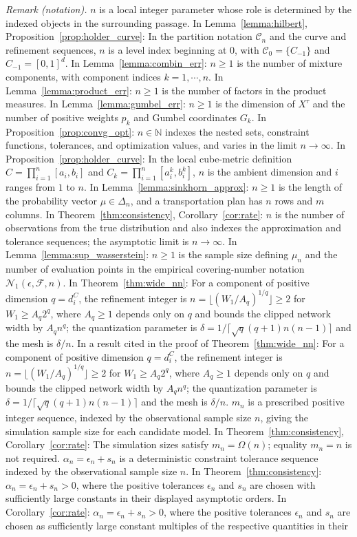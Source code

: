 \documentclass[12pt]{article}
\theoremstyle{plain}
\theoremstyle{definition}
\theoremstyle{remark}
\begin{document}
\noindent\textit{Remark (notation).} $n$ is a local integer parameter whose role is determined by the indexed objects in the surrounding passage. In Lemma~\ref{lemma:hilbert}, Proposition~\ref{prop:holder_curve}: In the partition notation $\mathcal{C}_n$ and the curve and refinement sequences, $n$ is a level index beginning at $0$, with $\mathcal{C}_0=\{C_{-1}\}$ and $C_{-1}=[0,1]^d$. In Lemma~\ref{lemma:combin_err}: $n\geqslant1$ is the number of mixture components, with component indices $k=1,\cdots,n$. In Lemma~\ref{lemma:product_err}: $n\geqslant1$ is the number of factors in the product measures. In Lemma~\ref{lemma:gumbel_err}: $n\geqslant1$ is the dimension of $X^\tau$ and the number of positive weights $p_k$ and Gumbel coordinates $G_k$. In Proposition~\ref{prop:convg_opt}: $n\in\mathbb{N}$ indexes the nested sets, constraint functions, tolerances, and optimization values, and varies in the limit $n\rightarrow\infty$. In Proposition~\ref{prop:holder_curve}: In the local cube-metric definition $C=\prod_{i=1}^{n}[a_i,b_i]$ and $C_k=\prod_{i=1}^{n}[a_i^k,b_i^k]$, $n$ is the ambient dimension and $i$ ranges from $1$ to $n$. In Lemma~\ref{lemma:sinkhorn_approx}: $n\geqslant1$ is the length of the probability vector $\mu\in\Delta_n$, and a transportation plan has $n$ rows and $m$ columns. In Theorem~\ref{thm:consistency}, Corollary~\ref{cor:rate}: $n$ is the number of observations from the true distribution and also indexes the approximation and tolerance sequences; the asymptotic limit is $n\rightarrow\infty$. In Lemma~\ref{lemma:sup_wasserstein}: $n\geqslant1$ is the sample size defining $\mu_n$ and the number of evaluation points in the empirical covering-number notation $\mathcal{N}_1(\epsilon,\mathcal{F},n)$. In Theorem~\ref{thm:wide_nn}: For a component of positive dimension $q=d_i^C$, the refinement integer is $n=\lfloor(W_1/A_q)^{1/q}\rfloor\geqslant2$ for $W_1\geqslant A_q2^q$, where $A_q\geqslant1$ depends only on $q$ and bounds the clipped network width by $A_qn^q$; the quantization parameter is $\delta=1/\lceil\sqrt q(q+1)n(n-1)\rceil$ and the mesh is $\delta/n$. In a result cited in the proof of Theorem~\ref{thm:wide_nn}: For a component of positive dimension $q=d_i^C$, the refinement integer is $n=\lfloor(W_1/A_q)^{1/q}\rfloor\geqslant2$ for $W_1\geqslant A_q2^q$, where $A_q\geqslant1$ depends only on $q$ and bounds the clipped network width by $A_qn^q$; the quantization parameter is $\delta=1/\lceil\sqrt q(q+1)n(n-1)\rceil$ and the mesh is $\delta/n$. $m_n$ is a prescribed positive integer sequence, indexed by the observational sample size $n$, giving the simulation sample size for each candidate model. In Theorem~\ref{thm:consistency}, Corollary~\ref{cor:rate}: The simulation sizes satisfy $m_n=\Omega(n)$; equality $m_n=n$ is not required. $\alpha_n=\epsilon_n+s_n$ is a deterministic constraint tolerance sequence indexed by the observational sample size $n$. In Theorem~\ref{thm:consistency}: $\alpha_n=\epsilon_n+s_n>0$, where the positive tolerances $\epsilon_n$ and $s_n$ are chosen with sufficiently large constants in their displayed asymptotic orders. In Corollary~\ref{cor:rate}: $\alpha_n=\epsilon_n+s_n>0$, where the positive tolerances $\epsilon_n$ and $s_n$ are chosen as sufficiently large constant multiples of the respective quantities in their 
\end{document}
